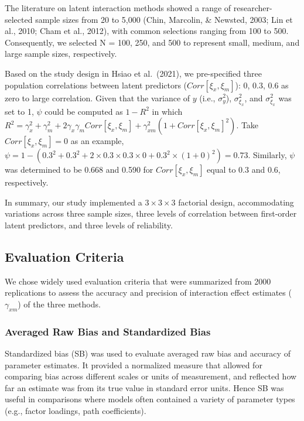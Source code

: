 \documentclass[
  man]{apa7}
\begin{document}
The literature on latent interaction methods showed a range of researcher-selected sample sizes from 20 to 5,000 (Chin, Marcolin, \& Newsted, 2003; Lin et al., 2010; Cham et al., 2012), with common selections ranging from 100 to 500. Consequently, we selected N = 100, 250, and 500 to represent small, medium, and large sample sizes, respectively.

Based on the study design in Hsiao et al.~(2021), we pre-specified three population correlations between latent predictors (\(Corr[{\xi_{x},\xi_{m}}]\)): 0, 0.3, 0.6 as zero to large correlation. Given that the variance of \(y\) (i.e., \(\sigma_{y}^2\)), \(\sigma_{\xi_{x}}^2\), and \(\sigma_{\xi_{x}}^2\) was set to 1, \(\psi\) could be computed as \(1 - R^2\) in which \(R^2 = \gamma_{x}^2 + \gamma_{m}^2 + 2\gamma_{x}\gamma_{m}Corr[{\xi_{x},\xi_{m}}] + \gamma_{xm}^2(1 + Corr[{\xi_{x},\xi_{m}}]^2)\). Take \(Corr[{\xi_{x},\xi_{m}}] = 0\) as an example, \(\psi = 1 - (0.3^2 + 0.3^2 + 2\times0.3\times0.3\times0 + 0.3^2\times(1 + 0)^2) = 0.73\). Similarly, \(\psi\) was determined to be 0.668 and 0.590 for \(Corr[{\xi_{x},\xi_{m}}]\) equal to 0.3 and 0.6, respectively.

In summary, our study implemented a \(3 \times 3 \times 3\) factorial design, accommodating variations across three sample sizes, three levels of correlation between first-order latent predictors, and three levels of reliability.

\hypertarget{evaluation-criteria}{%
\subsection{Evaluation Criteria}\label{evaluation-criteria}}

We chose widely used evaluation criteria that were summarized from 2000 replications to assess the accuracy and precision of interaction effect estimates (\(\gamma_{xm}\)) of the three methods.

\hypertarget{averaged-raw-bias-and-standardized-bias}{%
\subsubsection{Averaged Raw Bias and Standardized Bias}\label{averaged-raw-bias-and-standardized-bias}}

Standardized bias (SB) was used to evaluate averaged raw bias and accuracy of parameter estimates. It provided a normalized measure that allowed for comparing bias across different scales or units of measurement, and reflected how far an estimate was from its true value in standard error units. Hence SB was useful in comparisons where models often contained a variety of parameter types (e.g., factor loadings, path coefficients).
\end{document}
